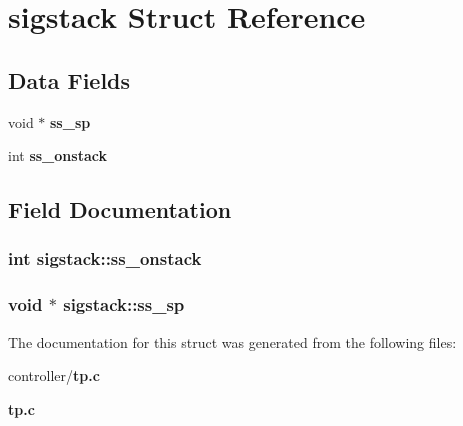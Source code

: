 \section{sigstack Struct Reference}
\label{structsigstack}
\subsection*{Data Fields}
\begin{DoxyCompactItemize}
\item 
void $\ast$ {\bf ss\_\-sp}
\item 
int {\bf ss\_\-onstack}
\end{DoxyCompactItemize}


\subsection{Field Documentation}
\subsubsection[{ss\_\-onstack}]{\setlength{\rightskip}{0pt plus 5cm}int {\bf sigstack::ss\_\-onstack}}\label{structsigstack_a44caef3891b7efa2d5b23f00b66c0525}
\subsubsection[{ss\_\-sp}]{\setlength{\rightskip}{0pt plus 5cm}void $\ast$ {\bf sigstack::ss\_\-sp}}\label{structsigstack_a41186d56cd2f701a19b1232b159ff3f6}


The documentation for this struct was generated from the following files:\begin{DoxyCompactItemize}
\item 
controller/{\bf tp.c}\item 
{\bf tp.c}\end{DoxyCompactItemize}
